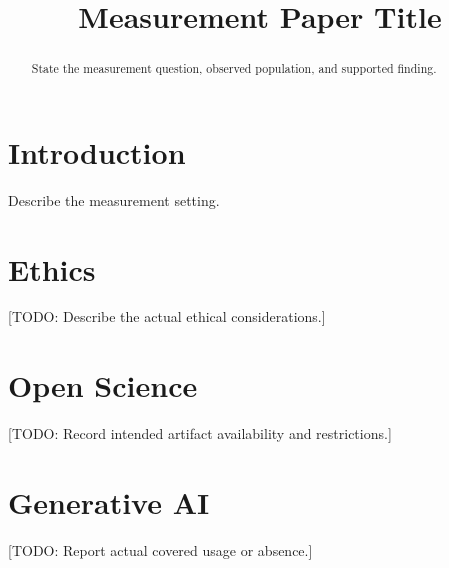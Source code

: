 \documentclass[10pt,sigconf,letterpaper,anonymous,nonacm]{acmart}
\title{Measurement Paper Title}
\begin{document}
\begin{abstract}
State the measurement question, observed population, and supported finding.
\end{abstract}
\maketitle
\section{Introduction}
Describe the measurement setting.
\appendix
\section{Ethics}
[TODO: Describe the actual ethical considerations.]
\section{Open Science}
[TODO: Record intended artifact availability and restrictions.]
\section{Generative AI}
[TODO: Report actual covered usage or absence.]
\end{document}
